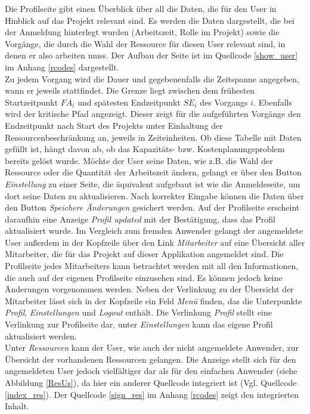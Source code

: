 \documentclass[a4paper,12pt,parskip,bibtotoc,liststotoc]{article}
\begin{document}
Die Profilseite gibt einen Überblick über all die Daten, die für den User in Hinblick auf das Projekt relevant sind. Es werden die Daten dargestellt, die bei der Anmeldung hinterlegt wurden (Arbeitszeit, Rolle im Projekt) sowie die Vorgänge, die durch die Wahl der Ressource für diesen User relevant sind, in denen er also arbeiten muss. Der Aufbau der Seite ist im Quellcode \ref{show_user} im Anhang \ref{rcodes} dargestellt.\\

Zu jedem Vorgang wird die Dauer und gegebenenfalls die Zeitspanne angegeben, wann er jeweils stattfindet. Die Grenze liegt zwischen dem frühesten Startzeitpunkt $FA_{i}$ und spätesten Endzeitpunkt $SE_{i}$ des Vorgangs $i$. Ebenfalls wird der kritische Pfad angezeigt. Dieser zeigt für die aufgeführten Vorgänge den Endzeitpunkt nach Start des Projekts unter Einhaltung der Ressourcenbeschränkung an, jeweils in Zeiteinheiten. Ob diese Tabelle mit Daten gefüllt ist, hängt davon ab, ob das Kapazitäts- bzw. Kostenplanungsproblem bereits gelöst wurde. Möchte der User seine Daten, wie z.B. die Wahl der Ressource oder die Quantität der Arbeitszeit ändern, gelangt er über den Button \textit{Einstellung} zu einer Seite, die äquivalent aufgebaut ist wie die Anmeldeseite, um dort seine Daten zu aktualisieren. Nach korrekter Eingabe können die Daten über den Button \textit{Speichere Änderungen} gesichert werden. Auf der Profilseite erscheint daraufhin eine Anzeige \textit{Profil updated} mit der Bestätigung, dass das Profil aktualisiert wurde. Im Vergleich zum fremden Anwender gelangt der angemeldete User außerdem in der Kopfzeile über den Link \textit{Mitarbeiter} auf eine Übersicht aller Mitarbeiter, die für das Projekt auf dieser Applikation angemeldet sind. Die Profilseite jedes Mitarbeiters kann betrachtet werden mit all den Informationen, die auch auf der eigenen Profilseite einzusehen sind. Es können jedoch keine Änderungen vorgenommen werden. Neben der Verlinkung zu der Übersicht der Mitarbeiter lässt sich in der Kopfzeile ein Feld \textit{Menü} finden, das die Unterpunkte \textit{Profil}, \textit{Einstellungen} und \textit{Logout} enthält. Die Verlinkung \textit{Profil} stellt eine Verlinkung zur Profilseite dar, unter \textit{Einstellungen} kann das eigene Profil aktualisiert werden.\\

Unter \textit{Ressourcen} kann der User, wie auch der nicht angemeldete Anwender, zur Übersicht der vorhandenen Ressourcen gelangen. Die Anzeige stellt sich für den angemeldeten User jedoch vielfältiger dar als für den einfachen Anwender (siehe Abbildung \ref{ResUs}), da hier ein anderer Quellcode integriert ist (Vgl. Quellcode \ref{index_res}). Der Quellcode \ref{sign_res} im Anhang \ref{rcodes} zeigt den integrierten Inhalt.\\
\end{document}
